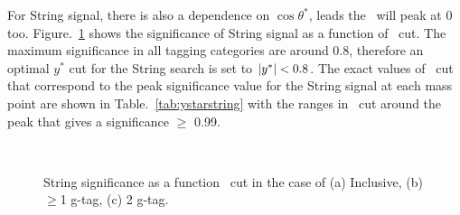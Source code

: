 For String signal, there is also a dependence on $\cos\theta^{*}$, leads the \ystar\ will peak at 0 too. Figure.~\ref{fig: string significance as a function of y* cut} shows the significance of String signal as a function of \ystar\ cut. The maximum significance in all tagging categories are around 0.8, therefore an optimal $y^{*}$ cut for the String search is set to $|y^\ast| < 0.8$. The exact values of \ystar\ cut that correspond to the peak significance value for the String signal at each mass point are shown in Table.~\ref{tab:ystarstring} with the ranges in \ystar\ cut around the peak that gives a significance $\geq$ 0.99.

\begin{figure}[!htb]
        \centering
        \\
        \caption{String significance as a function \ystar\ cut in the case of (a) Inclusive, (b) $\geq$1 g-tag, (c) 2 g-tag.}
        \label{fig: string significance as a function of y* cut}
\end{figure}


